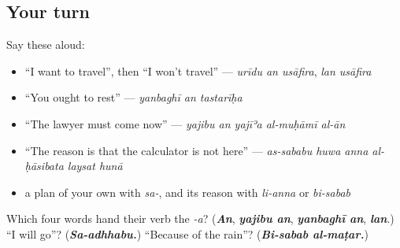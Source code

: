 \subsection*{Your turn}
Say these aloud:

\begin{itemize}
\raggedright
  \item \textquotedblleft{}I want to travel\textquotedblright{}, then \textquotedblleft{}I won't travel\textquotedblright{} — \emph{urīdu an usāfira}, \emph{lan usāfira}
  \item \textquotedblleft{}You ought to rest\textquotedblright{} — \emph{yanbaghī an tastarīḥa}
  \item \textquotedblleft{}The lawyer must come now\textquotedblright{} — \emph{yajibu an yajīʾa al-muḥāmī al-ān}
  \item \textquotedblleft{}The reason is that the calculator is not here\textquotedblright{} — \emph{as-sababu huwa anna al-ḥāsibata laysat hunā}
  \item a plan of your own with \emph{sa-}, and its reason with \emph{li-anna} or \emph{bi-sabab}
\end{itemize}

\begin{tcolorbox}[breakable,colback=teal!4,colframe=teal!35!black,title={Before you move on}]
Which four words hand their verb the \emph{-a}? (\emph{\textbf{An}}, \emph{\textbf{yajibu an}}, \emph{\textbf{yanbaghī an}}, \emph{\textbf{lan}}.) \textquotedblleft{}I will go\textquotedblright{}? (\emph{\textbf{Sa-adhhabu.}}) \textquotedblleft{}Because of the rain\textquotedblright{}? (\emph{\textbf{Bi-sabab al-maṭar.}})
\end{tcolorbox}
